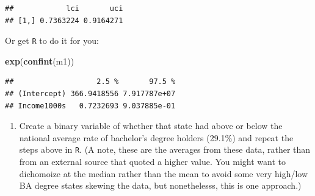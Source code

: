 \documentclass[]{article}
\newenvironment{Shaded}{\begin{snugshade}}{\end{snugshade}}
\newcommand{\DataTypeTok}[1]{\textcolor[rgb]{0.13,0.29,0.53}{#1}}
\newcommand{\DecValTok}[1]{\textcolor[rgb]{0.00,0.00,0.81}{#1}}
\newcommand{\FloatTok}[1]{\textcolor[rgb]{0.00,0.00,0.81}{#1}}
\newcommand{\KeywordTok}[1]{\textcolor[rgb]{0.13,0.29,0.53}{\textbf{#1}}}
\newcommand{\NormalTok}[1]{#1}
\newcommand{\OperatorTok}[1]{\textcolor[rgb]{0.81,0.36,0.00}{\textbf{#1}}}
\newcommand{\StringTok}[1]{\textcolor[rgb]{0.31,0.60,0.02}{#1}}
\providecommand{\tightlist}{%
  \setlength{\itemsep}{0pt}\setlength{\parskip}{0pt}}
\begin{document}
\begin{verbatim}
##            lci       uci
## [1,] 0.7363224 0.9164271
\end{verbatim}

Or get \texttt{R} to do it for you:

\begin{Shaded}
\begin{Highlighting}[]
\KeywordTok{exp}\NormalTok{(}\KeywordTok{confint}\NormalTok{(m1))}
\end{Highlighting}
\end{Shaded}

\begin{verbatim}
##                   2.5 %       97.5 %
## (Intercept) 366.9418556 7.917787e+07
## Income1000s   0.7232693 9.037885e-01
\end{verbatim}

\begin{enumerate}
\def\labelenumi{\arabic{enumi}.}
\setcounter{enumi}{9}
\tightlist
\item
  Create a binary variable of whether that state had above or below the
  national average rate of bachelor's degree holders (29.1\%) and repeat
  the steps above in \texttt{R}. (A note, these are the averages from
  these data, rather than from an external source that quoted a higher
  value. You might want to dichomoize at the median rather than the mean
  to avoid some very high/low BA degree states skewing the data, but
  nonethelesss, this is one approach.)
\end{enumerate}

\begin{Shaded}
\end{Shaded}
\end{document}
